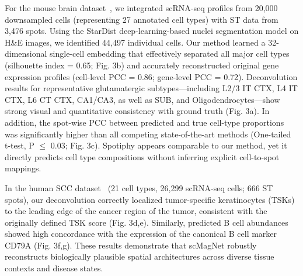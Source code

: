 \documentclass[10pt,a4paper]{article}
\begin{document}
For the mouse brain dataset~\cite{Yang2025}, we integrated scRNA-seq profiles from 20,000 downsampled cells (representing 27 annotated cell types) with ST data from 3,476 spots. Using the StarDist deep-learning-based nuclei segmentation model on H\&E images, we identified 44,497 individual cells. Our method learned a 32-dimensional single-cell embedding that effectively separated all major cell types (silhouette index = 0.65; Fig. 3b) and accurately reconstructed original gene expression profiles (cell-level PCC = 0.86; gene-level PCC = 0.72). Deconvolution results for representative glutamatergic subtypes---including L2/3 IT CTX, L4 IT CTX, L6 CT CTX, CA1/CA3, as well as SUB, and Oligodendrocytes---show strong visual and quantitative consistency with ground truth (Fig. 3a). In addition, the spot-wise PCC between predicted and true cell-type proportions was significantly higher than all competing state-of-the-art methods (One-tailed t-test, P $\leq$ 0.03; Fig. 3c). Spotiphy appears comparable to our method, yet it directly predicts cell type compositions without inferring explicit cell-to-spot mappings.

In the human SCC dataset~\cite{Ji2020} (21 cell types, 26,299 scRNA-seq cells; 666 ST spots), our deconvolution correctly localized tumor-specific keratinocytes (TSKs) to the leading edge of the cancer region of the tumor, consistent with the originally defined TSK score (Fig. 3d,e). Similarly, predicted B cell abundances showed high concordance with the expression of the canonical B cell marker CD79A (Fig. 3f,g). These results demonstrate that scMagNet robustly reconstructs biologically plausible spatial architectures across diverse tissue contexts and disease states.
\end{document}
